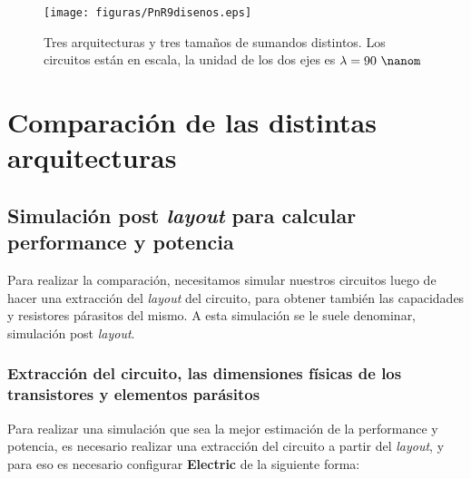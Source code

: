 \begin{figure}
\centering
\texttt{[image: figuras/PnR9disenos.eps]}
  \caption{Tres arquitecturas y tres tamaños de sumandos distintos. Los circuitos están en escala, la unidad de los dos ejes es $\lambda=90~\nanom$}
  \label{fig:diseños}
\end{figure}

\section{Comparación de las distintas arquitecturas}

\subsection{Simulación post \emph{layout} para calcular performance y potencia}
Para realizar la comparación, necesitamos simular nuestros circuitos luego de hacer una extracción del \emph{layout} del circuito, para obtener también las capacidades y resistores párasitos del mismo. A esta simulación se le suele denominar, simulación post \emph{layout}.

\subsubsection{Extracción del circuito, las dimensiones físicas de los transistores y elementos parásitos}

Para realizar una simulación que sea la mejor estimación de la performance y potencia, es necesario realizar una extracción del circuito a partir del \emph{layout}, y para eso es necesario configurar \textbf{Electric} de la siguiente forma:

